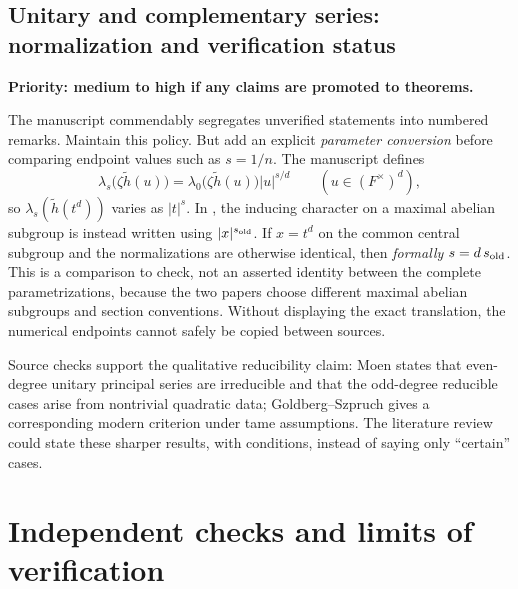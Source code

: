 \documentclass[12pt,letterpaper]{article}
\begin{document}
\subsection{Unitary and complementary series: normalization and verification status}
\textbf{Priority: medium to high if any claims are promoted to theorems.}

The manuscript commendably segregates unverified statements into numbered remarks. Maintain this policy. But add an explicit \emph{parameter conversion} before comparing endpoint values such as $s=1/n$. The manuscript defines
\[
\lambda_s\bigl(\zeta\widetilde h(u)\bigr)
 =\lambda_0\bigl(\zeta\widetilde h(u)\bigr)|u|^{s/d}
 \qquad (u\in(F^\times)^d),
\]
so $\lambda_s(\widetilde h(t^d))$ varies as $|t|^s$. In \cite[\S3.2]{Jo01}, the inducing character on a maximal abelian subgroup is instead written using $|x|^{s_{\rm old}}$. If $x=t^d$ on the common central subgroup and the normalizations are otherwise identical, then \emph{formally} $s=d\,s_{\rm old}$. This is a comparison to check, not an asserted identity between the complete parametrizations, because the two papers choose different maximal abelian subgroups and section conventions. Without displaying the exact translation, the numerical endpoints cannot safely be copied between sources.

Source checks support the qualitative reducibility claim: Moen \cite{Mo88} states that even-degree unitary principal series are irreducible and that the odd-degree reducible cases arise from nontrivial quadratic data; Goldberg--Szpruch \cite[Thm.~5.2]{GS16} gives a corresponding modern criterion under tame assumptions. The literature review could state these sharper results, with conditions, instead of saying only ``certain'' cases.

\section{Independent checks and limits of verification}
\label{sec:checks}
\end{document}
